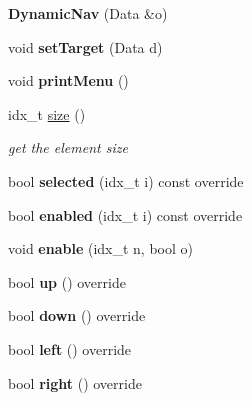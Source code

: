 \begin{DoxyCompactItemize}
\item 
\mbox{\label{classDynamicNav_a9de2fd4f00412b89edb25c7bb25f81b6}} 
{\bfseries Dynamic\+Nav} (Data \&o)
\item 
\mbox{\label{classDynamicNav_aa948cf92536376bea437b587a1ab6bed}} 
void {\bfseries set\+Target} (Data d)
\item 
\mbox{\label{classDynamicNav_a25fc31774efe41488da85911226dedba}} 
void {\bfseries print\+Menu} ()
\item 
idx\+\_\+t \hyperlink{classDynamicNav_a13aab7546c1a57cd7d999b22be2f2364}{size} ()
\begin{DoxyCompactList}\small\item\em get the element size \end{DoxyCompactList}\item 
\mbox{\label{classDynamicNav_ab83b1dcee3497f8ac1dcf79645d5eda6}} 
bool {\bfseries selected} (idx\+\_\+t i) const override
\item 
\mbox{\label{classDynamicNav_a936bedd336e917789c666b6a8dbda6e2}} 
bool {\bfseries enabled} (idx\+\_\+t i) const override
\item 
\mbox{\label{classDynamicNav_a0691923e63586a0a8f40d35a9f60215c}} 
void {\bfseries enable} (idx\+\_\+t n, bool o)
\item 
\mbox{\label{classDynamicNav_a311f6301899fe8022d1188a41b6d3a3d}} 
bool {\bfseries up} () override
\item 
\mbox{\label{classDynamicNav_af29357e2328551fb6d68b5d0652c5cbb}} 
bool {\bfseries down} () override
\item 
\mbox{\label{classDynamicNav_a056c94a768614ce2290ced9030868c75}} 
bool {\bfseries left} () override
\item 
\mbox{\label{classDynamicNav_a866d57846795b913329ee39fd670d942}} 
bool {\bfseries right} () override
\item 

\end{DoxyCompactItemize}
